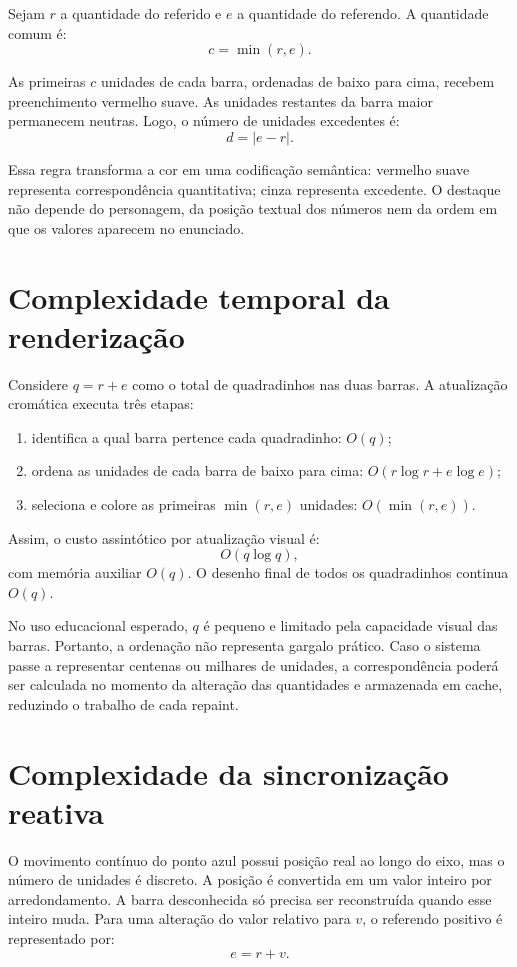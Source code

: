 \documentclass[12pt,a4paper]{article}
\begin{document}
Sejam $r$ a quantidade do referido e $e$ a quantidade do referendo. A quantidade comum é:
\[
 c = \min(r,e).
\]

As primeiras $c$ unidades de cada barra, ordenadas de baixo para cima, recebem preenchimento \textcolor{vermelhosuave}{vermelho suave}. As unidades restantes da barra maior permanecem neutras. Logo, o número de unidades excedentes é:
\[
 d = |e-r|.
\]

Essa regra transforma a cor em uma codificação semântica: vermelho suave representa correspondência quantitativa; cinza representa excedente. O destaque não depende do personagem, da posição textual dos números nem da ordem em que os valores aparecem no enunciado.

\section{Complexidade temporal da renderização}

Considere $q=r+e$ como o total de quadradinhos nas duas barras. A atualização cromática executa três etapas:

\begin{enumerate}
  \item identifica a qual barra pertence cada quadradinho: $O(q)$;
  \item ordena as unidades de cada barra de baixo para cima: $O(r\log r + e\log e)$;
  \item seleciona e colore as primeiras $\min(r,e)$ unidades: $O(\min(r,e))$.
\end{enumerate}

Assim, o custo assintótico por atualização visual é:
\[
 O(q\log q),
\]
com memória auxiliar $O(q)$. O desenho final de todos os quadradinhos continua $O(q)$.

No uso educacional esperado, $q$ é pequeno e limitado pela capacidade visual das barras. Portanto, a ordenação não representa gargalo prático. Caso o sistema passe a representar centenas ou milhares de unidades, a correspondência poderá ser calculada no momento da alteração das quantidades e armazenada em cache, reduzindo o trabalho de cada repaint.

\section{Complexidade da sincronização reativa}

O movimento contínuo do ponto azul possui posição real ao longo do eixo, mas o número de unidades é discreto. A posição é convertida em um valor inteiro por arredondamento. A barra desconhecida só precisa ser reconstruída quando esse inteiro muda. Para uma alteração do valor relativo para $v$, o referendo positivo é representado por:
\[
 e = r + v.
\]
\end{document}
